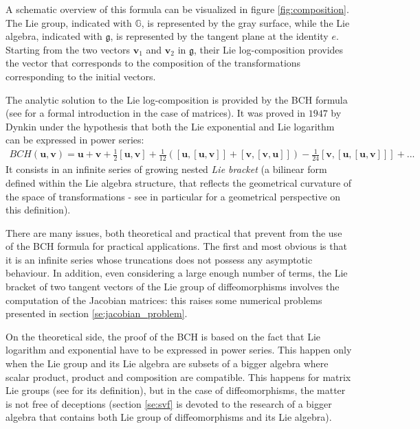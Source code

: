 A schematic overview of this formula can be visualized in figure \ref{fig:composition}. The Lie group, indicated with $\mathbb{G}$, is represented by the gray surface, while the Lie algebra, indicated with $\mathfrak{g}$, is represented by the tangent plane at the identity $e$.
Starting from the two vectors $\mathbf{v}_1$ and $\mathbf{v}_2$ in $\mathfrak{g}$, their Lie log-composition provides the vector that corresponds to the composition of the transformations corresponding to the initial vectors. 

The analytic solution to the Lie log-composition is provided by the BCH formula (see \cite{hall2015lie} for a formal introduction in the case of matrices). It was proved in $1947$ by Dynkin \cite{dynkin1947calculation} under the hypothesis that both the Lie exponential and Lie logarithm can be expressed in power series:
\begin{align*}
BCH(\mathbf{u},\mathbf{v}) 
= 
\mathbf{u} + \mathbf{v} + \frac{1}{2}[\mathbf{u},\mathbf{v}] + \frac{1}{12}([\mathbf{u},[\mathbf{u},\mathbf{v}]]
+ [\mathbf{v},[\mathbf{v},\mathbf{u}]]) - \frac{1}{24}[\mathbf{v},[\mathbf{u},[\mathbf{u},\mathbf{v}]]] +... 
\end{align*}
It consists in an infinite series of growing nested \emph{Lie bracket} (a bilinear form defined within the Lie algebra structure, that reflects the geometrical curvature of the space of transformations - see in particular \cite{misner1973gravitation} for a geometrical perspective on this definition).

There are many issues, both theoretical and practical that prevent from the use of the BCH formula for practical applications. The first and most obvious is that it is an infinite series whose truncations does not possess any asymptotic behaviour.
In addition, even considering a large enough number of terms, the Lie bracket of two tangent vectors of the Lie group of diffeomorphisms involves the computation of the Jacobian matrices: this raises some numerical problems presented in section \ref{se:jacobian_problem}.

On the theoretical side, the proof of the BCH is based on the fact that Lie logarithm and exponential have to be expressed in power series. This happen only when the Lie group and its Lie algebra are subsets of a bigger algebra where scalar product, product and composition are compatible. This happens for matrix Lie groups (see \cite{hall2015lie} for its definition), but in the case of diffeomorphisms, the matter is not free of deceptions (section \ref{se:svf} is devoted to the research of a bigger algebra that contains both Lie group of diffeomorphisms and its Lie algebra).
 
